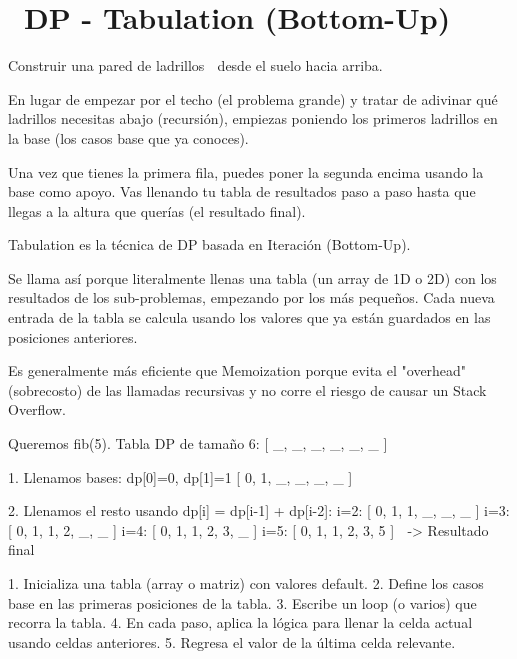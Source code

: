 ﻿\chapter[\emj{📋}~DP - Tabulation (Bottom-Up)]{~DP - Tabulation (Bottom-Up)}

\begin{dsaquees}
Construir una pared de ladrillos 🧱 desde el suelo hacia arriba. 

En lugar de empezar por el techo (el problema grande) y tratar de 
adivinar qué ladrillos necesitas abajo (recursión), empiezas poniendo
los primeros ladrillos en la base (los casos base que ya conoces). 

Una vez que tienes la primera fila, puedes poner la segunda encima 
usando la base como apoyo. Vas llenando tu tabla de resultados paso
a paso hasta que llegas a la altura que querías (el resultado final).
\end{dsaquees}
\begin{dsaotraforma}
Tabulation es la técnica de DP basada en Iteración (Bottom-Up). 

Se llama así porque literalmente llenas una tabla (un array de 1D 
o 2D) con los resultados de los sub-problemas, empezando por los 
más pequeños. Cada nueva entrada de la tabla se calcula usando los
valores que ya están guardados en las posiciones anteriores.

Es generalmente más eficiente que Memoization porque evita el 
"overhead" (sobrecosto) de las llamadas recursivas y no corre el 
riesgo de causar un Stack Overflow.
\end{dsaotraforma}
\begin{dsadiagrama}
Queremos fib(5).
Tabla DP de tamaño 6: [ \_, \_, \_, \_, \_, \_ ]

1. Llenamos bases: dp[0]=0, dp[1]=1
   [ 0, 1, \_, \_, \_, \_ ]

2. Llenamos el resto usando dp[i] = dp[i-1] + dp[i-2]:
   i=2: [ 0, 1, 1, \_, \_, \_ ]
   i=3: [ 0, 1, 1, 2, \_, \_ ]
   i=4: [ 0, 1, 1, 2, 3, \_ ]
   i=5: [ 0, 1, 1, 2, 3, 5 ] 🎉 -> Resultado final
\end{dsadiagrama}
\begin{dsacomofunciona}
1. Inicializa una tabla (array o matriz) con valores default.
2. Define los casos base en las primeras posiciones de la tabla.
3. Escribe un loop (o varios) que recorra la tabla.
4. En cada paso, aplica la lógica para llenar la celda actual 
   usando celdas anteriores.
5. Regresa el valor de la última celda relevante.
\end{dsacomofunciona}
